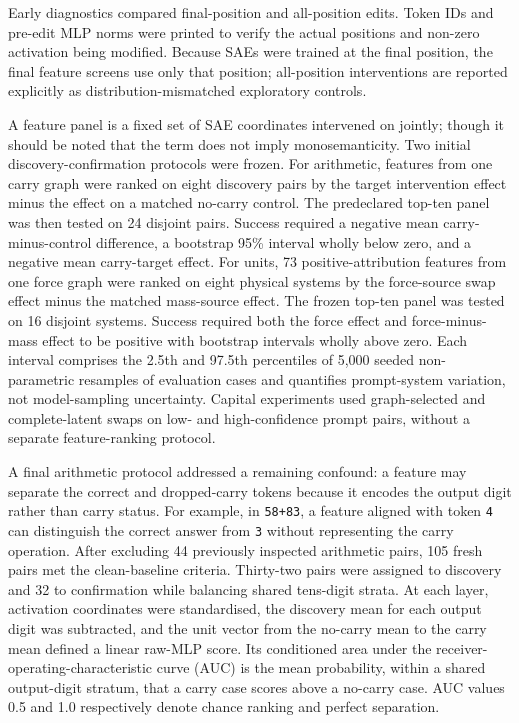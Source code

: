 \documentclass[11pt,a4paper]{article}
\newcommand{\code}[1]{\nolinkurl{#1}}
\begin{document}
    Early diagnostics compared final-position and all-position edits. Token IDs and pre-edit MLP norms were printed to verify the actual positions and non-zero activation being modified. Because SAEs were trained at the final position, the final feature screens use only that position; all-position interventions are reported explicitly as distribution-mismatched exploratory controls.

    A feature panel is a fixed set of SAE coordinates intervened on jointly; though it should be noted that the term does not imply monosemanticity. Two initial discovery-confirmation protocols were frozen. For arithmetic, features from one carry graph were ranked on eight discovery pairs by the target intervention effect minus the effect on a matched no-carry control. The predeclared top-ten panel was then tested on 24 disjoint pairs. Success required a negative mean carry-minus-control difference, a bootstrap 95\% interval wholly below zero, and a negative mean carry-target effect. For units, 73 positive-attribution features from one force graph were ranked on eight physical systems by the force-source swap effect minus the matched mass-source effect. The frozen top-ten panel was tested on 16 disjoint systems. Success required both the force effect and force-minus-mass effect to be positive with bootstrap intervals wholly above zero. Each interval comprises the 2.5th and 97.5th percentiles of 5,000 seeded non-parametric resamples of evaluation cases and quantifies prompt-system variation, not model-sampling uncertainty. Capital experiments used graph-selected and complete-latent swaps on low- and high-confidence prompt pairs, without a separate feature-ranking protocol.

    A final arithmetic protocol addressed a remaining confound: a feature may separate the correct and dropped-carry tokens because it encodes the output digit rather than carry status. For example, in \code{58+83}, a feature aligned with token \texttt{4} can distinguish the correct answer from \texttt{3} without representing the carry operation. After excluding 44 previously inspected arithmetic pairs, 105 fresh pairs met the clean-baseline criteria. Thirty-two pairs were assigned to discovery and 32 to confirmation while balancing shared tens-digit strata. At each layer, activation coordinates were standardised, the discovery mean for each output digit was subtracted, and the unit vector from the no-carry mean to the carry mean defined a linear raw-MLP score. Its conditioned area under the receiver-operating-characteristic curve (AUC) is the mean probability, within a shared output-digit stratum, that a carry case scores above a no-carry case. AUC values 0.5 and 1.0 respectively denote chance ranking and perfect separation.
\end{document}
